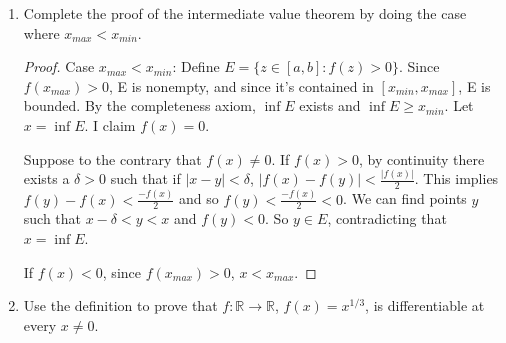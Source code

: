 \documentclass[12pt]{amsart}
\begin{document}
\begin{enumerate}
\begin{proof}
To finish the proof we need to find $x_{min},\,x_{max} \in [a,b]$ such that $f(x_{min}) = y_{min}$. Construct $\{ x_n \}_{n=1}^\infty$ as follows. For all $n\in\mathbb N$, there exists an $x_n\in [a,b]$ such that $y_{min} < f(x_n) < y_{min} + \tfrac 1 n$, $f(x_n) \ge y_{min}$ since $y_{min}$ is the infimum. If $x_n$ does not exist, then $f(x) \ge y_{min} + \tfrac 1 n$ for all $x\in [a,b]$. This contradicts the fact that $y_{min}$ is the greatest lower bound.

Since $y_{min} + \tfrac 1 n \to y_{min}$ as $n\to\infty$, by the squeeze lemma, $f(x_n)\to y_{min}$ as $n\to\infty$. This gives us a sequence $\{ x_n \}_{n=1}^\infty \subset [a,b]$. Since this sequence is bounded, it has a convergent subsequence by the Bolzano-Weierstrauss theorem. So there exists $\{ x_{n_k} \}_{k=1}^\infty$ and $x_{min}$ such that $x_{n_k} \to x_{min}$ as $k \to \infty$.

Claim: $x_{min} \in [a,b]$, since $a \le x_{n_k} \le b$ by a homework problem $a \le x_{min} \le b$. Therefore $f(x_{min})$ exists and by the lemma from class since $f$ is continuous at $x_{min}$, $f(x_{n_k}) \to y_{min}$ as $k\to\infty$ by the other in class lemma $f(x_{min}) = y_{min}$.
\end{proof}

\item Complete the proof of the intermediate value theorem by doing the case where $x_{max}<x_{min}$.  

\begin{proof}
Case $x_{max}<x_{min}$: Define $E=\{z\in [a,b] : f(z) > 0 \}$. Since $f(x_{max}) > 0$, E is nonempty, and since it's contained in $[x_{min}, x_{max}]$, E is bounded. By the completeness axiom, $\inf E$ exists and $\inf E \ge x_{min}$. Let $x=\inf E$. I claim $f(x)=0$.

Suppose to the contrary that $f(x) \not = 0$. If $f(x) > 0$, by continuity there exists a $\delta > 0$ such that if $|x-y|<\delta$, $|f(x)-f(y)|<\tfrac {|f(x)|} 2$. This implies $f(y)-f(x) < \tfrac {-f(x)} 2$ and so $f(y) < \tfrac {-f(x)} 2 < 0$. We can find points $y$ such that $x-\delta<y<x$ and $f(y)<0$. So $y \in E$, contradicting that $x=\inf E$.

If $f(x) < 0$, since $f(x_{max}) > 0$, $x<x_{max}$.
\end{proof}

\item Use the definition to prove that $f: \mathbb{R} \rightarrow \mathbb{R}$, $f(x)=x^{1/3}$, is differentiable at every $x\neq 0$.  


\end{enumerate}
\end{document}
